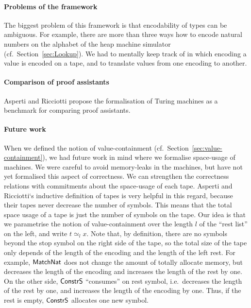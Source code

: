 \paragraph{Problems of the framework}
The biggest problem of this framework is that encodability of types can be ambiguous.  For example, there are more than three ways how to encode
natural numbers on the alphabet of the heap machine simulator (cf.\ Section~\ref{sec:Lookup}).  We had to mentally keep track of in which encoding a
value is encoded on a tape, and to translate values from one encoding to another.


\paragraph{Comparison of proof assistants}
Asperti and Ricciotti\cite{asperti2015} propose the formalisation of Turing machines as a benchmark for comparing proof assistants.



\paragraph{Future work}
When we defined the notion of value-containment (cf.\ Section~\ref{sec:value-containment}), we had future work in mind where we formalise space-usage
of machines.  We were careful to avoid memory-leaks in the machines, but have not yet formalised this aspect of correctness.  We can strengthen the
correctness relations with commitments about the space-usage of each tape.  Asperti and Ricciotti`s inductive definition of tapes is very helpful in
this regard, because their tapes never decrease the number of symbols.  This means that the total space usage of a tape is just the number of symbols
on the tape.  Our idea is that we parametrise the notion of value-containment over the length $l$ of the ``rest list'' on the left, and write
$t \simeq_{l} x$.  Note that, by definition, there are no symbols beyond the stop symbol on the right side of the tape, so the total size of the tape
only depends of the length of the encoding and the length of the left rest.  For example, $\mathsf{MatchNat}$ does not change the amount of totally
allocate memory, but decreases the length of the encoding and increases the length of the rest by one.  On the other side, $\mathsf{ConstrS}$ ``consumes''
on rest symbol, i.e.\ decreases the length of the rest by one, and increases the length of the encoding by one.  Thus, if the rest is empty,
$\mathsf{ConstrS}$ allocates one new symbol.

